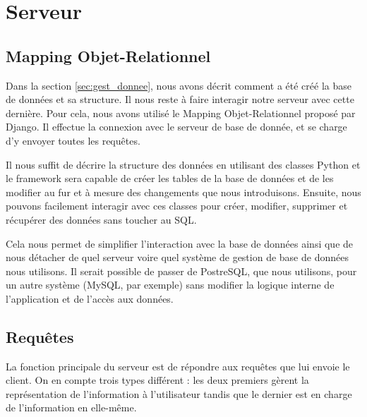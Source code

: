 \documentclass{EPL-master-thesis-covers-FR}
\begin{document}

		\section{Serveur}
			\label{sec:serveur}



			\subsection{Mapping Objet-Relationnel}

				Dans la section \ref{sec:gest_donnee}, nous avons décrit comment a été créé la base de données et sa structure. Il nous reste à faire interagir notre serveur avec cette dernière. Pour cela, nous avons utilisé le Mapping Objet-Relationnel proposé par Django. Il effectue la connexion avec le serveur de base de donnée, et se charge d'y envoyer toutes les requêtes.

				Il nous suffit de décrire la structure des données en utilisant des classes Python et le framework sera capable de créer les tables de la base de données et de les modifier au fur et à mesure des changements que nous introduisons. Ensuite, nous pouvons facilement interagir avec ces classes pour créer, modifier, supprimer et récupérer des données sans toucher au SQL.

				Cela nous permet de simplifier l'interaction avec la base de données ainsi que de nous détacher de quel serveur voire quel système de gestion de base de données nous utilisons. Il serait possible de passer de PostreSQL, que nous utilisons, pour un autre système (MySQL, par exemple) sans modifier la logique interne de l'application et de l'accès aux données.

			\subsection{Requêtes}

				La fonction principale du serveur est de répondre aux requêtes que lui envoie le client. On en compte trois types différent : les deux premiers gèrent la représentation de l'information à l'utilisateur tandis que le dernier est en charge de l'information en elle-même.
\end{document}
